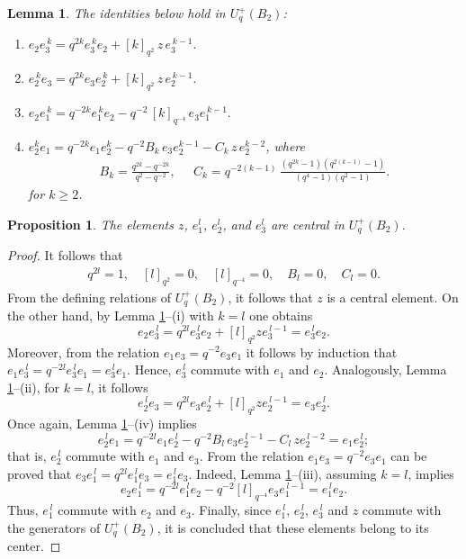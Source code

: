 \documentclass[11pt]{article}
\newtheorem{proposition}[theorem]{Proposition}
\newtheorem{lemma}[theorem]{Lemma}
\theoremstyle{definition}
\begin{document}
\begin{lemma}{\cite[Lemma 2.1]{BeraMukherjee2026UqB2}} \label{lem:B2}
The identities below hold in  $U_q^+(B_2)$:
\begin{enumerate}[\rm (i)]
\item $e_2 e_3^{\,k}=q^{2k} e_3^{\,k} e_2+ [k]_{q^2}\, z\, e_3^{\,k-1}.$
  \item $e_2^{\,k} e_3=q^{2k} e_3 e_2^{\,k}+[k]_{q^2}\, z\, e_2^{\,k-1}.$
  \item $e_2 e_1^{\,k}=q^{-2k} e_1^{\,k} e_2-q^{-2}\,[k]_{q^{-4}}\, e_3 e_1^{\,k-1}.$
  \item $e_2^{k} e_1= q^{-2k} e_1 e_2^{k}- q^{-2} B_k\, e_3 e_2^{k-1}
- C_k\, z\, e_2^{k-2}$, 
where 
\begin{align*}
B_k=\frac{q^{2k}-q^{-2k}}{q^{2}-q^{-2}},
\;\;\;\;\;
C_k = q^{-2(k-1)}\,\frac{(q^{2k}-1)(q^{2(k-1)}-1)}{(q^{4}-1)(q^{2}-1)}.
\end{align*}
for $k \geq 2$.
\end{enumerate}
\end{lemma}
\begin{proposition}
{\cite[Corollary 2.2]{BeraMukherjee2026UqB2}}\label{centro2} 
The elements \(z\), \(e_{1}^{l}\), \(e_{2}^{l}\), and \(e_{3}^{l}\) are central in \(U_q^{+}(B_2)\).
\end{proposition}
\begin{proof}
It follows that
\begin{align*}
 q^{2l}=1,\quad [l]_{q^{2}}=0,\quad [l]_{q^{-4}}=0,\quad B_l=0,\quad C_l=0.
\end{align*}
From the defining relations of \(U_q^{+}(B_2)\), it follows that $z$ is a central element. On the other hand, by  Lemma \ref{lem:B2}--(i) with $k=l$ one obtains 
\[
e_2 e_3^{\,l}=q^{2l} e_3^{\,l} e_2 + [l]_{q^{2}} z e_3^{\,l-1}=e_3^{\,l} e_2.
\]
Moreover, from the relation $e_1 e_3=q^{-2} e_3 e_1$ it follows by induction that 
$e_1 e_3^{\,l}=q^{-2l} e_3^{\,l} e_1=e_3^{\,l} e_1$. Hence,  $e_3^{\,l}$ commute with $e_1$ and $e_2$.
Analogously, Lemma \ref{lem:B2}--(ii), for $k=l$, it follows
\[
e_2^{\,l} e_3 = q^{2l} e_3 e_2^{\,l} + [l]_{q^{2}} z e_2^{\,l-1}= e_3 e_2^{\,l}.
\]
Once again, Lemma \ref{lem:B2}--(iv) implies
\[
e_2^{\,l} e_1 = q^{-2l} e_1 e_2^{\,l} - q^{-2} B_l\, e_3 e_2^{\,l-1} - C_l\, z e_2^{\,l-2}
= e_1 e_2^{\,l};
\]
that is, $e_2^{\,l}$ commute with $e_1$ and $e_3$. From the relation $e_1 e_3=q^{-2} e_3 e_1$ can be proved that $e_3 e_1^{\,l}=q^{2l} e_1^{\,l} e_3 = e_1^{\,l} e_3$. Indeed, Lemma \ref{lem:B2}--(iii), assuming $k=l$, implies
\[
e_2 e_1^{\,l}= q^{-2l} e_1^{\,l} e_2 - q^{-2}[l]_{q^{-4}} e_3 e_1^{\,l-1}
= e_1^{\,l} e_2.
\]
Thus, $e_1^{\,l}$ commute  with $e_2$ and $e_3$. 
Finally, since  $e_1^{\,l}$, $e_2^{\,l}$, $e_3^{\,l}$ and $z$ commute with the generators of $U_q^{+}(B_2)$, it is concluded that these elements belong to its center.
\end{proof}
\end{document}
